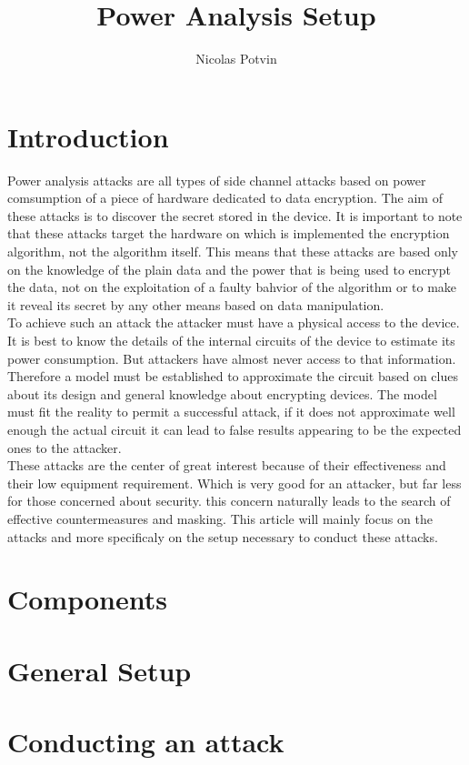 \documentclass[letterpaper]{article}
\title{Power Analysis Setup}
\author{Nicolas Potvin}
\begin{document}
\maketitle
\tableofcontents

\begin{abstract}
\end{abstract}

\section{Introduction}

Power analysis attacks are all types of side channel attacks based on power comsumption of a piece of hardware dedicated to data encryption. The aim of these attacks is to discover the secret stored in the device. It is important to note that these attacks target the hardware on which is implemented the encryption algorithm, not the algorithm itself. This means that these attacks are based only on the knowledge of the plain data and the power that is being used to encrypt the data, not on the exploitation of a faulty bahvior of the algorithm or to make it reveal its secret by any other means based on data manipulation.\\
To achieve such an attack the attacker must have a physical access to the device. It is best to know the details of the internal circuits of the device to estimate its power consumption. But attackers have almost never access to that information. Therefore a model must be established to approximate the circuit based on clues about its design and general knowledge about encrypting devices. The model must fit the reality to permit a successful attack, if it does not approximate well enough the actual circuit it can lead to false results appearing to be the expected ones to the attacker.\\
These attacks are the center of great interest because of their effectiveness and their low equipment requirement. Which is very good for an attacker, but far less for those concerned about security. this concern naturally leads to the search of effective countermeasures and masking. This article will mainly focus on the attacks and more specificaly on the setup necessary to conduct these attacks.

\section{Components}


\section{General Setup}


\section{Conducting an attack}
\end{document}
